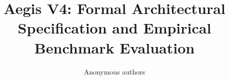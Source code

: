 \title{\textbf{Aegis V4: Formal Architectural Specification and Empirical Benchmark Evaluation}}

\author{Anonymous authors}
